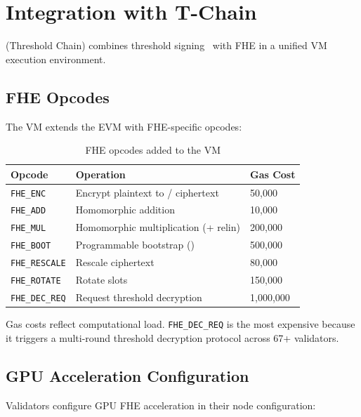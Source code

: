 \section{Integration with T-Chain}

\label{sec:tchain}

\Zoo{} \TChain{} (Threshold Chain) combines threshold signing~\cite{zoo-threshold-signatures} with FHE in a unified VM execution environment.

\subsection{FHE Opcodes}

The \TChain{} VM extends the EVM with FHE-specific opcodes:

\begin{table}[h]
\centering
\small
\begin{tabular}{lll}
\toprule
\textbf{Opcode} & \textbf{Operation} & \textbf{Gas Cost} \\
\midrule
\texttt{FHE\_ENC} & Encrypt plaintext to \TFHE{}/\CKKS{} ciphertext & 50{,}000 \\
\texttt{FHE\_ADD} & Homomorphic addition & 10{,}000 \\
\texttt{FHE\_MUL} & Homomorphic multiplication (+ relin) & 200{,}000 \\
\texttt{FHE\_BOOT} & Programmable bootstrap (\TFHE{}) & 500{,}000 \\
\texttt{FHE\_RESCALE} & Rescale \CKKS{} ciphertext & 80{,}000 \\
\texttt{FHE\_ROTATE} & Rotate \CKKS{} slots & 150{,}000 \\
\texttt{FHE\_DEC\_REQ} & Request threshold decryption & 1{,}000{,}000 \\
\bottomrule
\end{tabular}
\caption{FHE opcodes added to the \TChain{} VM}
\label{tab:opcodes}
\end{table}

Gas costs reflect computational load. \texttt{FHE\_DEC\_REQ} is the most expensive because it triggers a multi-round threshold decryption protocol across 67+ validators.

\subsection{GPU Acceleration Configuration}

Validators configure GPU FHE acceleration in their node configuration:

